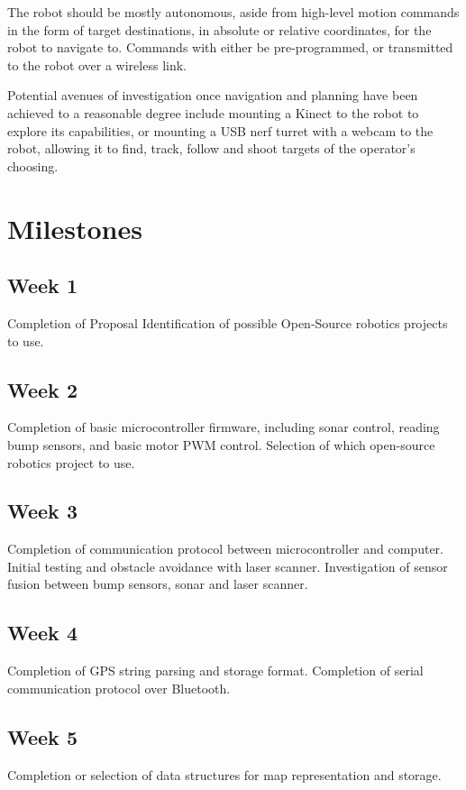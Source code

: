 \documentclass[a4paper,12pt]{article}
\begin{document}
The robot should be mostly autonomous, aside from high-level motion commands in the form of target destinations, in absolute or relative coordinates, for the robot to navigate to. Commands with either be pre-programmed, or transmitted to the robot over a wireless link.

Potential avenues of investigation once navigation and planning have been achieved to a reasonable degree include mounting a Kinect to the robot to explore its capabilities, or mounting a USB nerf turret with a webcam to the robot, allowing it to find, track, follow and shoot targets of the operator's choosing.

\section{Milestones}

\subsection{Week 1}
Completion of Proposal
Identification of possible Open-Source robotics projects to use.

\subsection{Week 2}
Completion of basic microcontroller firmware, including sonar control, reading bump sensors, and basic motor PWM control.
Selection of which open-source robotics project to use.

\subsection{Week 3}
Completion of communication protocol between microcontroller and computer.
Initial testing and obstacle avoidance with laser scanner.
Investigation of sensor fusion between bump sensors, sonar and laser scanner.

\subsection{Week 4}
Completion of GPS string parsing and storage format.
Completion of serial communication protocol over Bluetooth.

\subsection{Week 5}
Completion or selection of data structures for map representation and storage.
\end{document}
